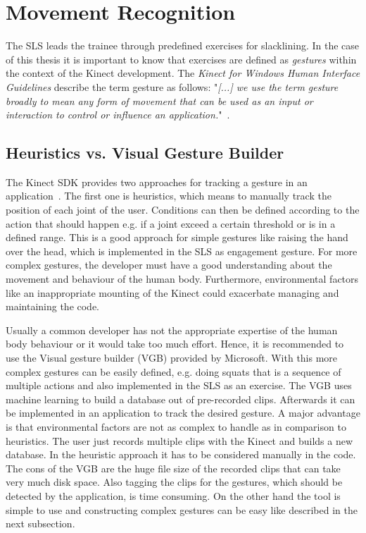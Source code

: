 \section{Movement Recognition}\label{5_3_movementRecognition}
The SLS leads the trainee through predefined exercises for slacklining. In the case of this thesis it is important to know that exercises are defined as \textit{gestures} within the context of the Kinect development. The \textit{Kinect for Windows Human Interface Guidelines} describe the term gesture as follows: "\textit{[...] we use the term gesture broadly to mean any form of movement that can be used as an input or interaction to control or influence an application.}"~\cite{MicrosoftHIG2014-mh}.

\subsection{Heuristics vs. Visual Gesture Builder}
The Kinect SDK provides two approaches for tracking a gesture in an application~\cite{MicrosoftVGB}.
The first one is heuristics, which means to manually track the position of each joint of the user.
Conditions can then be defined according to the action that should happen e.g. if a joint exceed a certain threshold or is in a defined range.
This is a good approach for simple gestures like raising the hand over the head, which is implemented in the SLS as engagement gesture.
For more complex gestures, the developer must have a good understanding about the movement and behaviour of the human body.
Furthermore, environmental factors like an inappropriate mounting of the Kinect could exacerbate managing and maintaining the code.

Usually a common developer has not the appropriate expertise of the human body behaviour or it would take too much effort.
Hence, it is recommended to use the Visual gesture builder (VGB) provided by Microsoft. 
With this more complex gestures can be easily defined, e.g. doing squats that is a sequence of multiple actions and also implemented in the SLS as an exercise.
The VGB uses machine learning to build a database out of pre-recorded clips.
Afterwards it can be implemented in an application to track the desired gesture.
A major advantage is that environmental factors are not as complex to handle as in comparison to heuristics.
The user just records multiple clips with the Kinect and builds a new database.
In the heuristic approach it has to be considered manually in the code.
The cons of the VGB are the huge file size of the recorded clips that can take very much disk space.
Also tagging the clips for the gestures, which should be detected by the application, is time consuming. 
On the other hand the tool is simple to use and constructing complex gestures can be easy like described in the next subsection.


